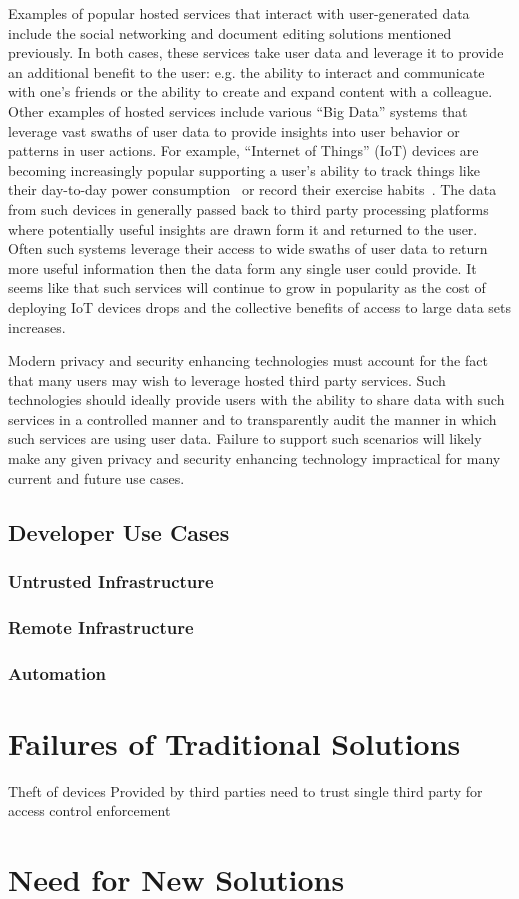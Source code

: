 Examples of popular hosted services that interact with user-generated
data include the social networking and document editing solutions
mentioned previously. In both cases, these services take user data and
leverage it to provide an additional benefit to the user: e.g. the
ability to interact and communicate with one's friends or the ability
to create and expand content with a colleague. Other examples of
hosted services include various ``Big Data'' systems that leverage
vast swaths of user data to provide insights into user behavior or
patterns in user actions. For example, ``Internet of Things'' (IoT)
devices are becoming increasingly popular supporting a user's ability
to track things like their day-to-day power consumption~\cite{neurio}
or record their exercise habits~\cite{fitbit}. The data from such
devices in generally passed back to third party processing platforms
where potentially useful insights are drawn form it and returned to
the user. Often such systems leverage their access to wide swaths of
user data to return more useful information then the data form any
single user could provide. It seems like that such services will
continue to grow in popularity as the cost of deploying IoT devices
drops and the collective benefits of access to large data sets
increases.

Modern privacy and security enhancing technologies must account for
the fact that many users may wish to leverage hosted third party
services. Such technologies should ideally provide users with the
ability to share data with such services in a controlled manner and to
transparently audit the manner in which such services are using user
data. Failure to support such scenarios will likely make any given
privacy and security enhancing technology impractical for many current
and future use cases.

\subsection{Developer Use Cases}

\subsubsection{Untrusted Infrastructure}

\subsubsection{Remote Infrastructure}

\subsubsection{Automation}

\section{Failures of Traditional Solutions}

Theft of devices
Provided by third parties
need to trust single third party for access control enforcement


\section{Need for New Solutions}

